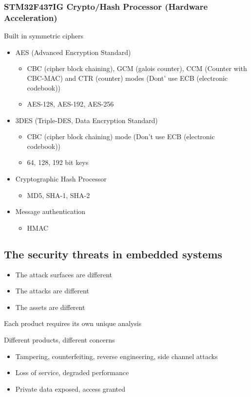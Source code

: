 \subsubsection{STM32F437IG Crypto/Hash Processor (Hardware Acceleration)}
Built in symmetric ciphers
\begin{itemize}
  \item AES (Advanced Encryption Standard)
  \begin{itemize}
    \item CBC (cipher block chaining), GCM (galois counter), CCM (Counter with CBC-MAC) and CTR (counter) modes (Dont' use ECB (electronic codebook))
    \item AES-128, AES-192, AES-256
  \end{itemize}
  \item 3DES (Triple-DES, Data Encryption Standard)
  \begin{itemize}
    \item CBC (cipher block chaining) mode (Don't use ECB (electronic codebook))
    \item 64, 128, 192 bit keys
  \end{itemize}
  \item Cryptographic Hash Processor
  \begin{itemize}
    \item MD5, SHA-1, SHA-2
  \end{itemize}
  \item Message authentication
  \begin{itemize}
    \item HMAC
  \end{itemize}
\end{itemize}

\subsection{The security threats in embedded systems}
\begin{itemize}
  \item The attack surfaces are different
  \item The attacks are different
  \item The assets are different
\end{itemize}

Each product requires its own unique analysis

Different products, different concerns
\begin{itemize}
  \item Tampering, counterfeiting, reverse engineering, side channel attacks
  \item Loss of service, degraded performance
  \item Private data exposed, access granted
\end{itemize}

